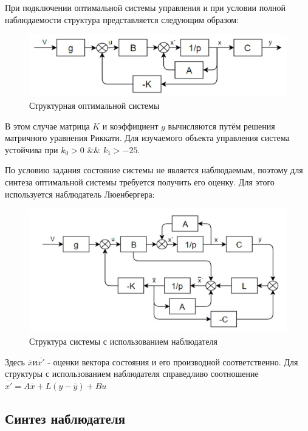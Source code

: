 \documentclass[14pt,a4paper,report]{report}
\begin{document}
При подключении оптимальной системы управления и при условии полной наблюдаемости структура представляется следующим образом:

\begin{figure}[h!]
	\centering
	\includegraphics[scale = 0.40]{images/1.png}
	\caption{Структурная оптимальной системы}
	\label{image:2}
\end{figure}

В этом случае матрица $K$ и коэффициент $g$ вычисляются путём решения матричного уравнения Риккати. Для изучаемого объекта управления система устойчива при $k_0>0$ $\&\&$ $k_1>-25$.

По условию задания состояние системы не является наблюдаемым, поэтому для синтеза оптимальной системы требуется получить его оценку. Для этого используется наблюдатель Люенбергера:

\begin{figure}[h!]
	\centering
	\includegraphics[scale = 0.37]{images/2.png}
	\caption{Структура системы с использованием наблюдателя}
	\label{image:3}
\end{figure}

Здесь $\overline{x} и \overline{x'}$ - оценки вектора состояния и его производной соответственно. Для структуры с использованием наблюдателя справедливо соотношение $\overline{x'}=A\overline{x}+L(y-\overline{y})+Bu$

\subsection{Синтез наблюдателя}
\end{document}
